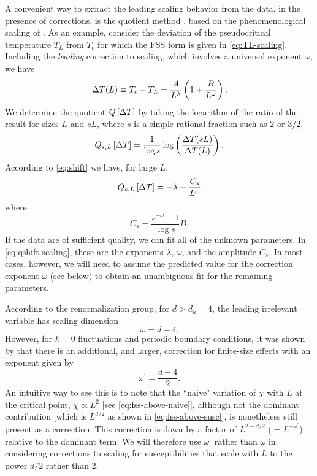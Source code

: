 A convenient way to extract the leading scaling behavior from the data, in the
presence of corrections, is the quotient method
\autocite{ballesteros1996finite}, based on the phenomenological scaling of
\textcite{nightingale1976scaling}. As an example, consider the deviation of the
pseudocritical temperature $T_L$ from $T_c$ for which the FSS form is given in
\cref{eq:TL-scaling}. Including the \emph{leading} correction to scaling, which
involves a universal exponent $\omega$, we have
\begin{equation}
  \Delta T(L) \equiv T_c - T_L =
  \frac{A}{L^{\lambda}}\left(1 + \frac{B}{L^{\omega}}\right).
  \label{eq:shift}
\end{equation}
We determine the quotient $Q\left[\Delta T\right]$ by taking the logarithm of the
ratio of the result for sizes $L$ and $s L$, where $s$ is a simple rational
fraction such as $2$ or $3/2$,
\begin{equation}
  Q_{s,L}\left[\Delta T\right]
  = \frac{1}{\log s} \log\left(\frac{\Delta T(s L)}{\Delta T(L)}\right).
  \label{eq:qshift}
\end{equation}
According to \cref{eq:shift} we have, for large $L$,
\begin{equation}
  Q_{s,L}\left[\Delta T\right] = -\lambda + \frac{C_s}{L^{\omega}}
  \label{eq:qshift-scaling}
\end{equation}
where
\begin{equation}
  C_s = \frac{s^{-\omega} - 1}{\log s} B.
\end{equation}
If the data are of sufficient quality, we can fit all of the unknown
parameters. In \cref{eq:qshift-scaling}, these are the exponents $\lambda$,
$\omega$, and the amplitude $C_s$. In most cases, however, we will need to
assume the predicted value for the correction exponent $\omega$ (see below) to
obtain an unambiguous fit for the remaining parameters.

According to the renormalization group, for $d > d_u = 4$, the leading
irrelevant variable has scaling dimension
\begin{equation}
  \omega = d - 4.
\end{equation}
However, for $k=0$ fluctuations and periodic boundary conditions, it was shown
by \textcite{brezin1985finite} that there is an additional, and larger,
correction for finite-size effects with an exponent given by
\begin{equation}
  \omega^{\prime} = \frac{d-4}{2}.
  \label{eq:correction-k0}
\end{equation}
An intuitive way to see this is to note that the ``naive" variation of $\chi$
with $L$ at the critical point, $\chi \propto L^2$ [see
\cref{eq:fss-above-naive}], although not the dominant contribution [which is
$L^{d/2}$ as shown in \cref{eq:fss-above-susc}], is nonetheless still present
as a correction. This correction is down by a factor of $L^{2-d/2}$
($=L^{-\omega^{\prime}}$) relative to the dominant term. We will therefore use
$\omega^{\prime}$ rather than $\omega$ in considering corrections to scaling
for susceptibilities that scale with $L$ to the power $d/2$ rather than 2.

